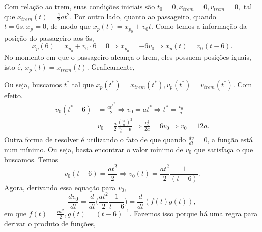\documentclass{article}
\begin{document}
  Com rela\c c\~ao ao trem, suas condi\c c\~oes iniciais s\~ao $t_{0} = 0, x_{trem} = 0, v_{trem} = 0,$ tal que $x_{trem}(t) = \frac{1}{2}at^{2}$. 
Por outro lado, quanto ao passageiro, quando $t=6s, x_{p} = 0$, de modo que $x_{p}(t) = x_{p_0} + v_{0}t$. Como temos a informa\c c\~ao da posi\c c\~ao
do passageiro aos 6s, 
  $$
    x_{p}(6) = x_{p_{0}} + v_{0} \cdot6 = 0 \Rightarrow x_{p_{0}} = -6v_{0} \Rightarrow x_{p}(t) = v_{0}(t-6).
  $$
  No momento em que o passageiro alcan\c ca o trem, eles possuem posi\c c\~oes iguais, isto \'e, $x_{p}(t) = x_{trem}(t)$. Graficamente,
 \begin{center}
 \end{center}
  Ou seja, buscamos $t^{*}$ tal que $x_{p}(t^{*}) = x_{trem}(t^{*}), v_{p}(t^{*}) = v_{trem}(t^{*})$. Com efeito,
 \begin{align*}
   v_{0}(t^{*} - 6) &= \frac{at^{*^{2}}}{2} \Rightarrow v_{0} = at^{*} \Rightarrow t^{*} = \frac{v_{0}}{a}\\
                    &v_{0} = \frac{a}{2}\frac{(\frac{v_{0}}{a})^{2}}{\frac{v_{0}}{a}-6} \Rightarrow \frac{v_{0}^{2}}{2a} = 6v_{0} \Rightarrow v_{0} = 12a.
 \end{align*}
 Outra forma de resolver \'e utilizando o fato de que quando $\frac{dv}{dt} = 0$, a fun\c c\~ao est\'a num m\'inimo. Ou seja, basta encontrar
o valor m\'inimo de $v_{0}$ que satisfa\c ca o que buscamos. Temos 
  $$
    v_{0}(t-6) = \frac{at^{2}}{2} \Rightarrow v_{0}(t) = \frac{at^{2}}{2}\frac{1}{(t-6)}.
  $$ 
  Agora, derivando essa equa\c c\~ao para $v_{0},$ 
    $$
      \frac{dv_{0}}{dt} = \frac{d}{dt}\biggl(\frac{at^{2}}{2}\frac{1}{t-6}\biggr) = \frac{d}{dt}(f(t)g(t)),
    $$
    em que $f(t) = \frac{at^{2}}{2}, g(t) = (t-6)^{-1}$. Fazemos isso porque h\'a uma regra para derivar o produto de fun\c c\~oes,
\end{document}
